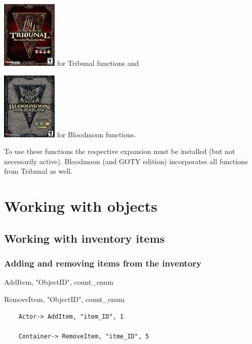 \includegraphics{media/image6.png} for Tribunal functions and

\includegraphics{media/image7.png} for Bloodmoon functions.

To use these functions the respective expansion must be installed (but
not necessarily active). Bloodmoon (and GOTY edition) incorporates all
functions from Tribunal as well.

\hypertarget{working-with-objects}{%
\section{\texorpdfstring{\hfill\break
Working with
objects}{ Working with objects}}\label{working-with-objects}}

\hypertarget{working-with-inventory-items}{%
\subsection{Working with inventory
items}\label{working-with-inventory-items}}

\hypertarget{adding-and-removing-items-from-the-inventory}{%
\subsubsection{Adding and removing items from the
inventory}\label{adding-and-removing-items-from-the-inventory}}

	AddItem, "ObjectID", count\_enum
	
	RemoveItem, "ObjectID", count\_enum

\begin{lstlisting}	
	Actor-> AddItem, "item_ID", 1
	
	Container-> RemoveItem, "itme_ID", 5
\end{lstlisting}

